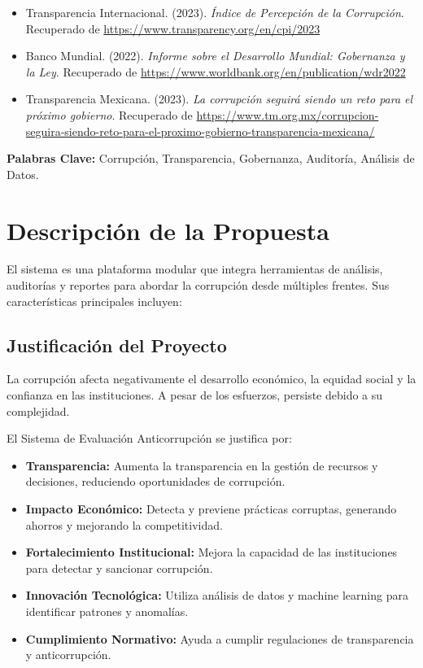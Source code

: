 \documentclass[a4paper,12pt]{article}
\begin{document}
\begin{itemize}
    \item Transparencia Internacional. (2023). \textit{Índice de Percepción de la Corrupción}. Recuperado de \url{https://www.transparency.org/en/cpi/2023}
    \item Banco Mundial. (2022). \textit{Informe sobre el Desarrollo Mundial: Gobernanza y la Ley}. Recuperado de \url{https://www.worldbank.org/en/publication/wdr2022}
    \item Transparencia Mexicana. (2023). \textit{La corrupción seguirá siendo un reto para el próximo gobierno}. Recuperado de \url{https://www.tm.org.mx/corrupcion-seguira-siendo-reto-para-el-proximo-gobierno-transparencia-mexicana/}
\end{itemize}

\textbf{Palabras Clave: }
Corrupción, Transparencia, Gobernanza, Auditoría, Análisis de Datos.

\section{Descripción de la Propuesta}
El sistema es una plataforma modular que integra herramientas de análisis, auditorías y reportes para abordar la corrupción desde múltiples frentes. Sus características principales incluyen:

\subsection{Justificación del Proyecto}
La corrupción afecta negativamente el desarrollo económico, la equidad social y la confianza en las instituciones. A pesar de los esfuerzos, persiste debido a su complejidad.

El Sistema de Evaluación Anticorrupción se justifica por:

\begin{itemize}
    \item \textbf{Transparencia:} Aumenta la transparencia en la gestión de recursos y decisiones, reduciendo oportunidades de corrupción.
    \item \textbf{Impacto Económico:} Detecta y previene prácticas corruptas, generando ahorros y mejorando la competitividad.
    \item \textbf{Fortalecimiento Institucional:} Mejora la capacidad de las instituciones para detectar y sancionar corrupción.
    \item \textbf{Innovación Tecnológica:} Utiliza análisis de datos y machine learning para identificar patrones y anomalías.
    \item \textbf{Cumplimiento Normativo:} Ayuda a cumplir regulaciones de transparencia y anticorrupción.
\end{itemize}
\end{document}
